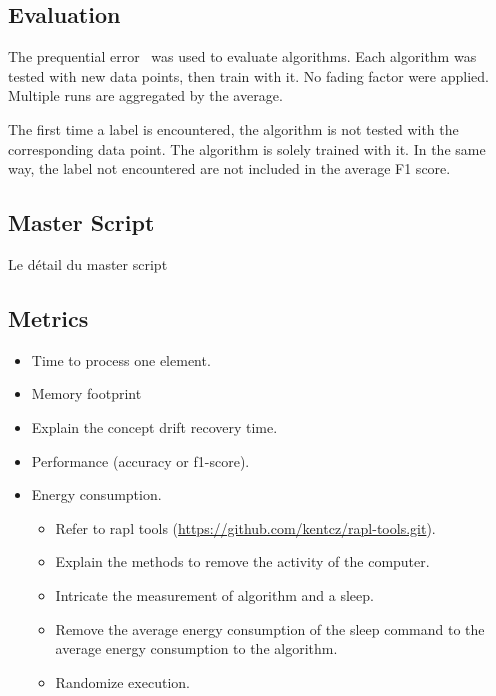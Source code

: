 \subsection{Evaluation}

The prequential error~\cite{issues_learning_from_stream} was used to evaluate algorithms. Each
algorithm was tested with new data points, then train with it. No fading factor
were applied. Multiple runs are aggregated by the average.

The first time a label is encountered, the algorithm is not tested with the
corresponding data point. The algorithm is solely trained with it. In the same
way, the label not encountered are not included in the average F1 score.

\subsection{Master Script}
Le détail du master script
\subsection{Metrics}
\begin{itemize}
	\item Time to process one element.
	\item Memory footprint
	\item Explain the concept drift recovery time.
	\item Performance (accuracy or f1-score).
	\item Energy consumption.
	\begin{itemize}
		\item Refer to rapl tools (\url{https://github.com/kentcz/rapl-tools.git}).
		\item Explain the methods to remove the activity of the computer.
		\item Intricate the measurement of algorithm and a sleep.
		\item Remove the average energy consumption of the sleep command to the average energy consumption to the algorithm.
		\item Randomize execution.
	\end{itemize}
\end{itemize}

